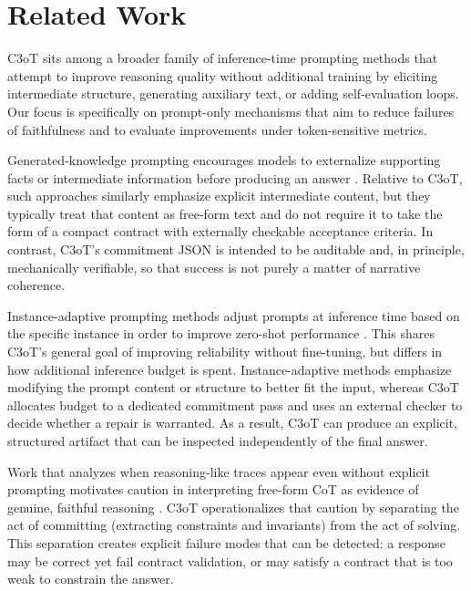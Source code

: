 \documentclass[journal,article,submit,pdftex,moreauthors]{Definitions/mdpi}
\begin{document}
\section{Related Work}

C3oT sits among a broader family of inference-time prompting methods that attempt to improve reasoning quality without additional training by eliciting intermediate structure, generating auxiliary text, or adding self-evaluation loops. Our focus is specifically on prompt-only mechanisms that aim to reduce failures of faithfulness and to evaluate improvements under token-sensitive metrics.

Generated-knowledge prompting encourages models to externalize supporting facts or intermediate information before producing an answer \cite{kunin-2022-generated}. Relative to C3oT, such approaches similarly emphasize explicit intermediate content, but they typically treat that content as free-form text and do not require it to take the form of a compact contract with externally checkable acceptance criteria. In contrast, C3oT’s commitment JSON is intended to be auditable and, in principle, mechanically verifiable, so that success is not purely a matter of narrative coherence.

Instance-adaptive prompting methods adjust prompts at inference time based on the specific instance in order to improve zero-shot performance \cite{grossmann-2024-instance}. This shares C3oT’s general goal of improving reliability without fine-tuning, but differs in how additional inference budget is spent. Instance-adaptive methods emphasize modifying the prompt content or structure to better fit the input, whereas C3oT allocates budget to a dedicated commitment pass and uses an external checker to decide whether a repair is warranted. As a result, C3oT can produce an explicit, structured artifact that can be inspected independently of the final answer.

Work that analyzes when reasoning-like traces appear even without explicit prompting motivates caution in interpreting free-form CoT as evidence of genuine, faithful reasoning \cite{schreck-2023-chain}. C3oT operationalizes that caution by separating the act of committing (extracting constraints and invariants) from the act of solving. This separation creates explicit failure modes that can be detected: a response may be correct yet fail contract validation, or may satisfy a contract that is too weak to constrain the answer.
\end{document}
